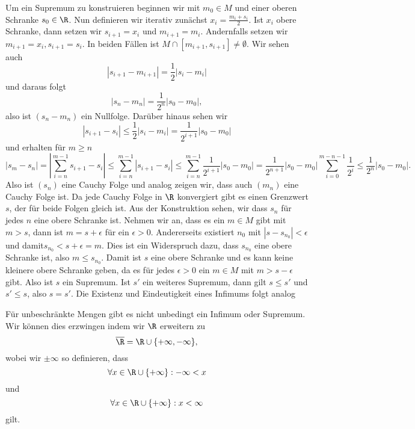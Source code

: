 \documentclass[letterpaper,10pt,english]{jupyterBook}
\begin{document}
\begin{emphBox}{}{}
Um ein Supremum zu konstruieren beginnen wir mit \(m_0 \in M\) und einer oberen Schranke \(s_0 \in \R\). Nun definieren wir iterativ zunächst \(x_i=\frac{m_i+s_i}2\). Ist \(x_i\) obere Schranke, dann setzen wir \(s_{i+1}=x_i\) und \(m_{i+1}=m_i\). Andernfalls setzen wir \(m_{i+1}=x_i, s_{i+1}=s_i\). In beiden Fällen ist \(M \cap [m_{i+1},s_{i+1}] \neq \emptyset\). Wir sehen auch
\begin{equation*}
|s_{i+1} - m_{i+1}| = \frac{1}2 |s_i - m_i|
\end{equation*}
und daraus folgt
\begin{equation*}
|s_n - m_n| = \frac{1}{2^n} |s_0-m_0|,
\end{equation*}
also ist \((s_n-m_n)\) ein Nullfolge. Darüber hinaus sehen wir
\begin{equation*}
 |s_{i+1}-s_i| \leq \frac{1}2 |s_i - m_i|  = \frac{1}{2^{i+1}} |s_0-m_0|
\end{equation*}
und erhalten für \(m\geq n\)
\begin{equation*}
 |s_m - s_n| = |\sum_{i=n}^{m-1} s_{i+1}-s_i| \leq \sum_{i=n}^{m-1} |s_{i+1}-s_i| \leq  \sum_{i=n}^{m-1}\frac{1}{2^{i+1}} |s_0-m_0| = \frac{1}{2^{n+1}}  |s_0-m_0| \sum_{i=0}^{m-n-1}\frac{1}{2^{i}} \leq \frac{1}{2^{n}}  |s_0-m_0|.
\end{equation*}
Also ist \((s_n)\) eine Cauchy Folge und analog zeigen wir, dass auch \((m_n)\) eine Cauchy Folge ist. Da jede Cauchy Folge in \(\R\) konvergiert gibt es einen Grenzwert \(s\), der für beide Folgen gleich ist. Aus der Konstruktion sehen, wir dass \(s_n\) für jedes \(n\) eine obere Schranke ist. Nehmen wir an, dass es ein \(m \in M\) gibt mit \(m > s\), dann ist \(m=s+\epsilon\) für ein \(\epsilon > 0\). Andererseits existiert \(n_0\) mit \(|s-s_{n_0}|< \epsilon\) und damit\(s_{n_0} < s + \epsilon = m\). Dies ist ein Widerspruch dazu, dass \(s_{n_0}\) eine obere Schranke ist, also \(m \leq s_{n_0}\). Damit ist \(s\) eine obere Schranke und es kann keine kleinere obere Schranke geben, da es für jedes \(\epsilon > 0\) ein \(m \in M\) mit \(m > s-\epsilon\) gibt. Also ist \(s\) ein Supremum. Ist \(s'\) ein weiteres Supremum, dann gilt \(s \leq s'\) und \(s' \leq s\), also \(s=s'\). Die Existenz und Eindeutigkeit eines Infimums folgt analog
\end{emphBox}

Für unbeschränkte Mengen gibt es nicht unbedingt ein Infimum oder Supremum. Wir können dies erzwingen indem wir \(\R\) erweitern zu
\begin{equation*}
 \overline{\R} = \R \cup \{+\infty,-\infty\},
\end{equation*}
wobei wir \(\pm \infty\) so definieren, dass
\begin{equation*}
 \forall x\in \R \cup \{+\infty\} : - \infty < x
\end{equation*}
und
\begin{equation*}
 \forall x\in \R \cup \{+\infty\} : x < \infty\end{equation*}
gilt.
\end{document}
